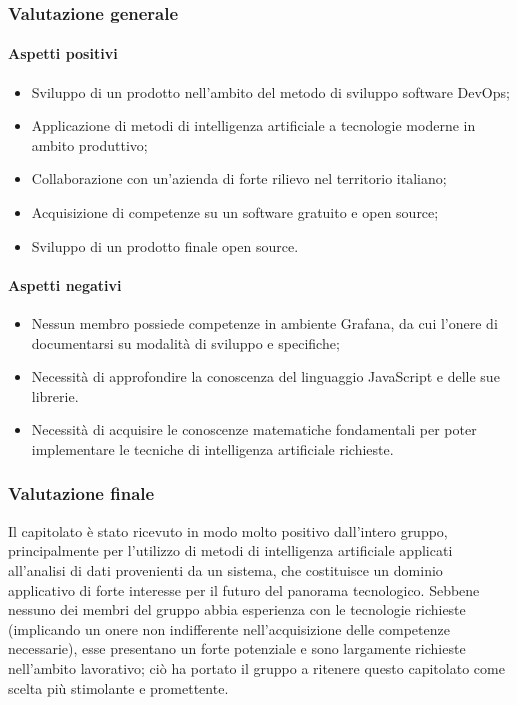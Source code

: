 	\subsubsection{Valutazione generale}
	\paragraph{Aspetti positivi}
	\begin{itemize}
		\item{Sviluppo di un prodotto nell'ambito del metodo di sviluppo software DevOps;}
		\item{Applicazione di metodi di intelligenza artificiale a tecnologie moderne in ambito produttivo;}
		\item{Collaborazione con un'azienda di forte rilievo nel territorio italiano;}
		\item{Acquisizione di competenze su un software gratuito e open source;}
		\item{Sviluppo di un prodotto finale open source.}
	\end{itemize}
	\paragraph{Aspetti negativi}	
	\begin{itemize}
		\item{Nessun membro possiede competenze in ambiente Grafana, da cui l'onere di documentarsi su modalità di sviluppo e  specifiche;} 
		\item{Necessità di approfondire la conoscenza del linguaggio JavaScript e delle sue librerie.}
		\item{Necessità di acquisire le conoscenze matematiche fondamentali per poter implementare le tecniche di intelligenza artificiale richieste.}
	\end{itemize} 
	\subsubsection{Valutazione finale}
	
	Il capitolato è stato ricevuto in modo molto positivo dall'intero gruppo, principalmente per l'utilizzo di metodi di intelligenza artificiale applicati all'analisi di dati provenienti da un sistema, che costituisce un dominio applicativo di forte interesse per il futuro del panorama tecnologico. Sebbene nessuno dei membri del gruppo abbia esperienza con le tecnologie richieste (implicando un onere non indifferente nell'acquisizione delle competenze necessarie), esse presentano un forte potenziale e sono largamente richieste nell'ambito lavorativo; ciò ha portato il gruppo a ritenere questo capitolato come scelta più stimolante e promettente.
	\pagebreak		
	
